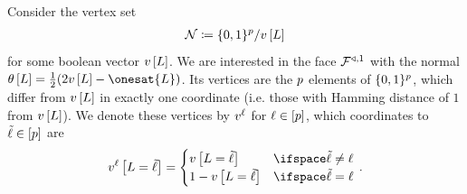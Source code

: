 \begin{example}
    \label{exa:tt_diagonal_face}
    Consider the vertex set
    \begin{align*}
        \mathcal{N} \coloneqq \{0,1\}^{p} / v\left[L\right]
    \end{align*}
    for some boolean vector $v\left[L\right]$.
    We are interested in the face $\mathcal{F}^{\triangleleft,1}$ with the normal $\canparamwith=\frac{1}{2} (2\imelementwith - \onesat{\selvariable})$.
    Its vertices are the $p$ elements of $\{0,1\}^{p}$, which differ from $v\left[L\right]$ in exactly one coordinate (i.e. those with Hamming distance of $1$ from $v\left[L\right]$).
    We denote these vertices by $v^{\ell}$ for $\ell\in[p]$, which coordinates to $\tilde{\ell}\in[p]$ are
    \begin{align*}
        \imelementofat{\selindex}{\selvariable=\secselindex}
        = \begin{cases}
              \imelementat{\selvariable=\secselindex} & \ifspace \secselindex\neq\selindex \\
              1-\imelementat{\selvariable=\secselindex} & \ifspace \secselindex=\selindex
        \end{cases} \, .
    \end{align*}


\end{example}
